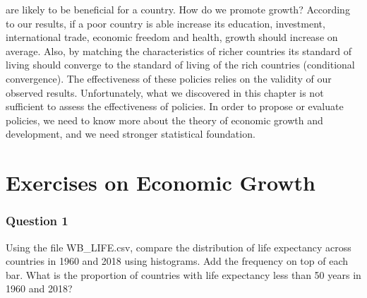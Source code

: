\documentclass[letterpaper]{article}\usepackage[]{graphicx}\usepackage[]{color}
\numberwithin{exer}{section}
\theoremstyle{nonumberplain}
\begin{document}
\begin{itemize}
  are likely to be beneficial for a country. How do we promote growth?
  According to our results, if a poor country is able increase its
  education, investment, international trade, economic freedom and
  health, growth should increase on average. Also, by matching the
  characteristics of richer countries its standard of living should
  converge to the standard of living of the rich countries
  (conditional convergence). The effectiveness of these policies
  relies on the validity of our observed results. Unfortunately, what
  we discovered in this chapter is not sufficient to assess the
  effectiveness of policies. In order to propose or evaluate policies,
  we need to know more about the theory of economic growth and
  development, and we need stronger statistical foundation.

  \end{itemize}



\section{Exercises on Economic Growth}

\subsubsection*{Question 1}
Using the file WB\_LIFE.csv, compare the distribution of life
expectancy across countries in 1960 and 2018 using histograms. Add the
frequency on top of each bar. What is the proportion of countries with
life expectancy less than 50 years in 1960 and 2018?
\end{document}
